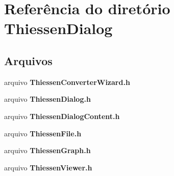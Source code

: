 \section{Referência do diretório Thiessen\+Dialog}
\label{dir_f078fb104685cc1eb7e77852836e95fd}
\subsection*{Arquivos}
\begin{DoxyCompactItemize}
\item 
arquivo {\bf Thiessen\+Converter\+Wizard.\+h}
\item 
arquivo {\bf Thiessen\+Dialog.\+h}
\item 
arquivo {\bf Thiessen\+Dialog\+Content.\+h}
\item 
arquivo {\bf Thiessen\+File.\+h}
\item 
arquivo {\bf Thiessen\+Graph.\+h}
\item 
arquivo {\bf Thiessen\+Viewer.\+h}
\end{DoxyCompactItemize}
